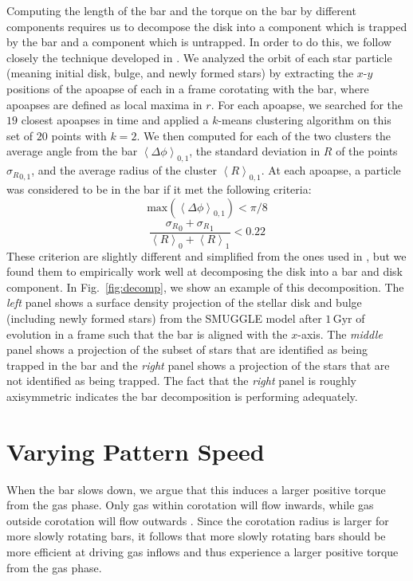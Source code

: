 \documentclass[fleqn,usenatbib]{mnras}
\begin{document}
Computing the length of the bar and the torque on the bar by different
components requires us to decompose the disk into a component which is trapped
by the bar and a component which is untrapped. In order to do this, we follow
closely the technique developed in \citet{2016MNRAS.463.1952P}. We analyzed the
orbit of each star particle (meaning initial disk, bulge, and newly formed
stars) by extracting the $x$-$y$ positions of the apoapse of each in a frame
corotating with the bar, where apoapses are defined as local maxima in $r$. For
each apoapse, we searched for the $19$ closest apoapses in time and applied a
$k$-means clustering algorithm on this set of $20$ points with $k=2$. We then
computed for each of the two clusters the average angle from the bar
$\left<\Delta \phi\right>_{0,1}$, the standard deviation in $R$ of the points
${\sigma_R}_{0,1}$, and the average radius of the cluster
$\left<R\right>_{0,1}$. At each apoapse, a particle was considered to be in the
bar if it met the following criteria:
\begin{equation}
\textrm{max}\left(\left<\Delta \phi\right>_{0,1}\right) < \pi / 8
\end{equation}
\begin{equation}
\frac{{\sigma_R}_0 + {\sigma_R}_1}{\left<R\right>_0 + \left<R\right>_1} < 0.22
\end{equation}
These criterion are slightly different and simplified from the ones used in \citet{2016MNRAS.463.1952P}, but we found them to empirically work well at
decomposing the disk into a bar and disk component. In Fig.~\ref{fig:decomp}, we show an example of this decomposition. The
\textit{left} panel shows a surface density projection of the stellar disk and
bulge (including newly formed stars) from the SMUGGLE model after
$1\,\text{Gyr}$ of evolution in a frame such that the bar is aligned with the
$x$-axis. The \textit{middle} panel shows a projection of the subset of stars
that are identified as being trapped in the bar and the \textit{right} panel
shows a projection of the stars that are not identified as being trapped. The
fact that the \textit{right} panel is roughly axisymmetric indicates the bar
decomposition is performing adequately.

\section{Varying Pattern Speed}
\label{app:varyps}
When the bar slows down, we argue that this induces a larger positive torque
from the gas phase. Only gas within corotation will flow inwards, while gas
outside corotation will flow outwards \citep{2011MNRAS.415.1027H}. Since the
corotation radius is larger for more slowly rotating bars, it follows that
more slowly rotating bars should be more efficient at driving gas inflows and
thus experience a larger positive torque from the gas phase.
\end{document}
